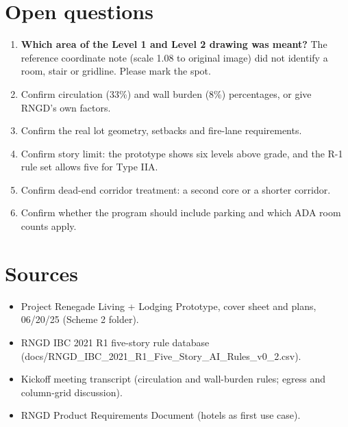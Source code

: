 \documentclass[10pt]{article}
\begin{document}
\section{Open questions}
\begin{enumerate}
\item \textbf{Which area of the Level 1 and Level 2 drawing was meant?} The reference coordinate note
(scale 1.08 to original image) did not identify a room, stair or gridline. Please mark the spot.
\item Confirm circulation (33\%) and wall burden (8\%) percentages, or give RNGD's own factors.
\item Confirm the real lot geometry, setbacks and fire-lane requirements.
\item Confirm story limit: the prototype shows six levels above grade, and the R-1 rule set allows five for Type IIA.
\item Confirm dead-end corridor treatment: a second core or a shorter corridor.
\item Confirm whether the program should include parking and which ADA room counts apply.
\end{enumerate}

\section{Sources}
\begin{itemize}
\item Project Renegade Living + Lodging Prototype, cover sheet and plans, 06/20/25 (Scheme 2 folder).
\item RNGD IBC 2021 R1 five-story rule database (docs/RNGD\_IBC\_2021\_R1\_Five\_Story\_AI\_Rules\_v0\_2.csv).
\item Kickoff meeting transcript (circulation and wall-burden rules; egress and column-grid discussion).
\item RNGD Product Requirements Document (hotels as first use case).
\end{itemize}
\end{document}
